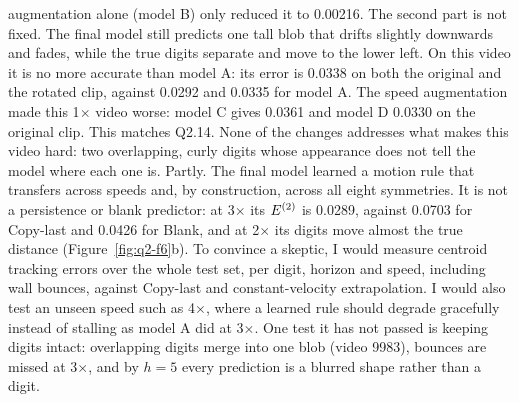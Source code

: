 augmentation alone (model B) only reduced it to 0.00216. The second part is not fixed. The final model still
predicts one tall blob that drifts slightly downwards and fades, while the true digits separate and move
to the lower left. On this video it is no more accurate than model A: its error is 0.0338 on both the
original and the rotated clip, against 0.0292 and 0.0335 for model A. The speed augmentation made this
1$\times$ video worse: model C gives 0.0361 and model D 0.0330 on the original clip. This matches Q2.14.
None of the changes addresses what makes this video hard: two overlapping, curly digits whose appearance
does not tell the model where each one is.
 Partly. The final model learned a motion rule that transfers across speeds and, by construction,
across all eight symmetries. It is not a persistence or blank predictor: at 3$\times$ its $E^{(2)}$ is 0.0289,
against 0.0703 for Copy-last and 0.0426 for Blank, and at 2$\times$ its digits move almost the true
distance (Figure~\ref{fig:q2-f6}b). To convince a skeptic, I would measure centroid tracking errors over
the whole test set, per digit, horizon and speed, including wall bounces, against Copy-last and
constant-velocity extrapolation. I would also test an unseen speed such as 4$\times$, where a learned rule
should degrade gracefully instead of stalling as model A did at 3$\times$. One test it has not passed is
keeping digits intact: overlapping digits merge into one blob (video 9983), bounces are missed at
3$\times$, and by $h=5$ every prediction is a blurred shape rather than a digit.
